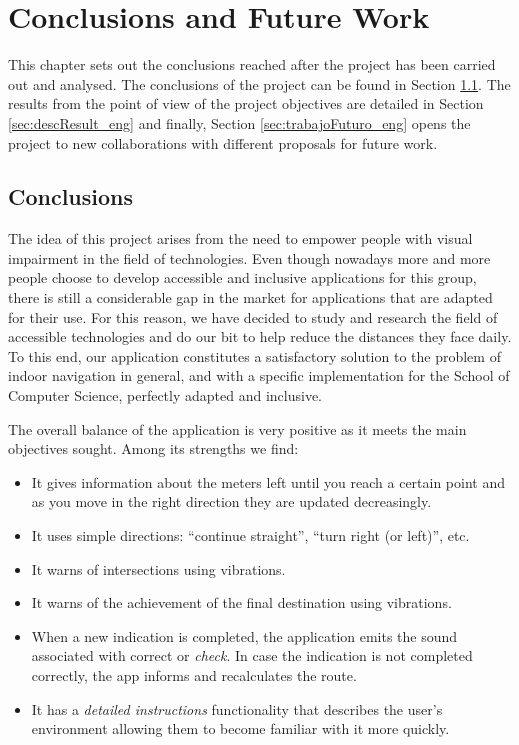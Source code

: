 \chapter{Conclusions and Future Work}
\label{cap:conclusions}

This chapter sets out the conclusions reached after the project has been carried out and analysed. The conclusions of the project can be found in Section \ref{sec:concluFinales_eng}. The results from the point of view of the project objectives are detailed in Section \ref{sec:descResult_eng} and finally, Section \ref{sec:trabajoFuturo_eng} opens the project to new collaborations with different proposals for future work.


\section{Conclusions}
\label{sec:concluFinales_eng}

The idea of this project arises from the need to empower people with visual impairment in the field of technologies. Even though nowadays more and more people choose to develop accessible and inclusive applications for this group, there is still a considerable gap in the market for applications that are adapted for their use. For this reason, we have decided to study and research the field of accessible technologies and do our bit to help reduce the distances they face daily. To this end, our application constitutes a satisfactory solution to the problem of indoor navigation in general, and with a specific implementation for the School of Computer Science, perfectly adapted and inclusive.

The overall balance of the application is very positive as it meets the main objectives sought. Among its strengths we find:

\begin{itemize}
	\item It gives information about the meters left until you reach a certain point and as you move in the right direction they are updated decreasingly.
	\item It uses simple directions: ``continue straight'', ``turn right (or left)'', etc.
	\item It warns of intersections using vibrations.
	\item It warns of the achievement of the final destination using vibrations.
	\item When a new indication is completed, the application emits the sound associated with correct or \textit{check}. In case the indication is not completed correctly, the app informs and recalculates the route.
	\item It has a \textit{detailed instructions} functionality that describes the user's environment allowing them to become familiar with it more quickly.
\end{itemize}



